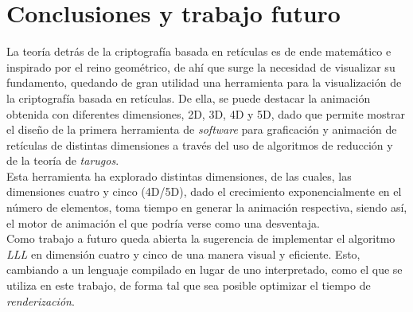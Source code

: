 \documentclass{llncs}
\begin{document}
\section{Conclusiones y trabajo futuro}
\label{Conclusiones} 
La teor\'ia detr\'as de la criptograf\'ia basada en ret\'iculas es de ende matem\'atico e inspirado por el reino geom\'etrico, de ahí que surge la necesidad de visualizar su fundamento, quedando de gran utilidad una herramienta para la visualización de la criptografía basada en ret\'iculas. De ella, se puede destacar la animación obtenida con diferentes dimensiones, 2D, 3D, 4D y 5D, dado que permite mostrar el diseño de la primera herramienta de \textit{software} para graficación y animación de ret\'iculas de distintas dimensiones a través del uso de algoritmos de reducci\'on y de la teor\'ia de \textit{tarugos}. \\
Esta herramienta ha explorado distintas dimensiones, de las cuales, las dimensiones cuatro y cinco (4D/5D), dado el crecimiento exponencialmente en el n\'umero de elementos, toma tiempo en generar la animación respectiva, siendo as\'i, el motor de animaci\'on el que podría verse como una desventaja.\\
Como trabajo a futuro queda abierta la sugerencia de implementar el algoritmo \textit{LLL} en dimensi\'on cuatro y cinco de una manera visual y eficiente. Esto, cambiando a un lenguaje compilado en lugar de uno interpretado, como el que se utiliza en este trabajo, de forma tal que sea posible optimizar el tiempo de \textit{renderizaci\'on}. \\
\end{document}
